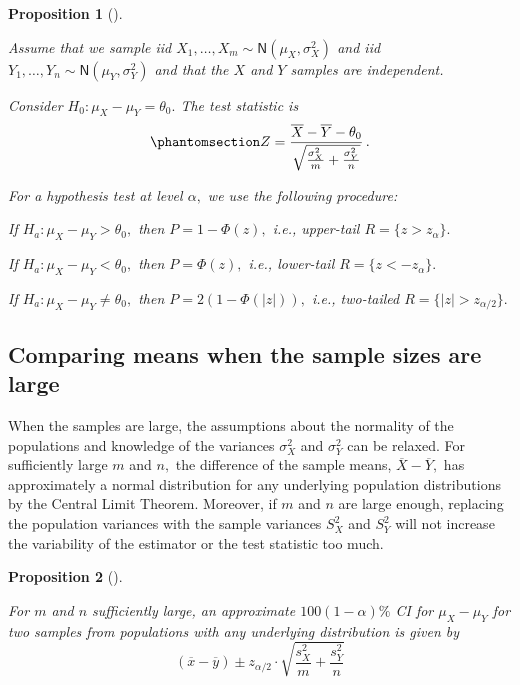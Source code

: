 \documentclass[
  a4paper,
  DIV=11,
  numbers=noendperiod,
  oneside]{scrreprt}
\theoremstyle{plain}
\theoremstyle{definition}
\theoremstyle{definition}
\theoremstyle{definition}
\theoremstyle{plain}
\newtheorem{proposition}{Proposition}[chapter]
\theoremstyle{remark}
\begin{document}
\begin{proposition}[]\protect\hypertarget{prp-htest-compare-means-normpops-vars-known}{}\label{prp-htest-compare-means-normpops-vars-known}

Assume that we sample iid
\(X_1, \dots, X_m \sim \mathsf{N}(\mu_X, \sigma_X^2)\) and iid
\(Y_1, \dots, Y_n \sim \mathsf{N}(\mu_Y, \sigma_Y^2)\) and that the
\(X\) and \(Y\) samples are independent.

Consider \(H_0 : \mu_X - \mu_Y = \theta_0.\) The test statistic is
\begin{equation}\phantomsection\label{eq-htest-compare-means-normpops-vars-known-statistic}{
 Z = \frac{\overline{X} - \overline{Y} - \theta_0}{\sqrt{\frac{\sigma_{X}^2}{m} + \frac{\sigma_{Y}^2}{n}}}\,.
}\end{equation}

For a hypothesis test at level \(\alpha,\) we use the following
procedure:

If \(H_a : \mu_X - \mu_Y > \theta_0,\) then \(P = 1 - \Phi(z),\) i.e.,
upper-tail \(R = \{z > z_{\alpha}\}.\)

If \(H_a : \mu_X - \mu_Y < \theta_0,\) then \(P = \Phi(z),\) i.e.,
lower-tail \(R = \{z < - z_{\alpha}\}.\)

If \(H_a : \mu_X - \mu_Y \neq \theta_0,\) then \(P = 2(1-\Phi(|z|)),\)
i.e., two-tailed \(R = \{|z| > z_{\alpha/2}\}.\)

\end{proposition}

\subsection{Comparing means when the sample sizes are
large}\label{sec-compare-means-large-samples}

When the samples are large, the assumptions about the normality of the
populations and knowledge of the variances \(\sigma_X^2\) and
\(\sigma_Y^2\) can be relaxed. For sufficiently large \(m\) and \(n,\)
the difference of the sample means, \(\overline{X} - \overline{Y},\) has
approximately a normal distribution for any underlying population
distributions by the Central Limit Theorem. Moreover, if \(m\) and \(n\)
are large enough, replacing the population variances with the sample
variances \(S_X^2\) and \(S_Y^2\) will not increase the variability of
the estimator or the test statistic too much.

\begin{proposition}[]\protect\hypertarget{prp-ci-compare-means-large-samples}{}\label{prp-ci-compare-means-large-samples}

For \(m\) and \(n\) sufficiently large, an approximate
\(100(1-\alpha)\%\) CI for \(\mu_X - \mu_Y\) for two samples from
populations with any underlying distribution is given by \[
 (\overline{x} - \overline{y}) \pm z_{\alpha/2} 
 \cdot \sqrt{\frac{s_{X}^2}{m} + \frac{s_{Y}^2}{n}}
\]

\end{proposition}
\end{document}
